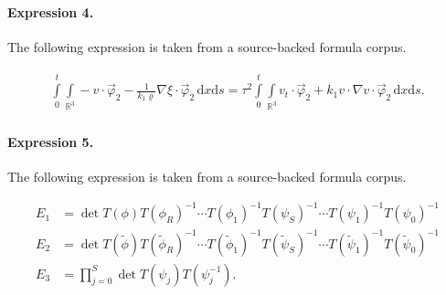 \documentclass[11pt]{article}
\begin{document}
\paragraph{Expression 4.} The following expression is taken from a source-backed formula corpus.

\begin{align*}\begin{array}{ll}\int\limits_0^t \int\limits_{\mathbb{R}^3}- v \cdot\vec{\varphi}_2 - \frac{1}{k_1\varrho}\nabla\xi\cdot\vec{\varphi}_2\,\mathrm{d}x\mathrm{d}s= \tau^2\int\limits_0^t \int\limits_{\mathbb{R}^3}v_t \cdot \vec{\varphi}_2 + k_1 v\cdot\nabla v \cdot\vec{\varphi}_2\,\mathrm{d}x\mathrm{d}s.\end{array}\end{align*}

\paragraph{Expression 5.} The following expression is taken from a source-backed formula corpus.

\begin{align*}E_1 &= \det T(\phi) T(\phi_R)^{-1}\cdots T(\phi_1)^{-1} T(\psi_S)^{-1}\cdots T(\psi_1)^{-1} T(\psi_0)^{-1}\\E_2 &= \det T(\tilde{\phi}) T(\tilde{\phi}_R)^{-1}\cdots T(\tilde{\phi}_1)^{-1}T(\tilde{\psi}_S)^{-1}\cdots T(\tilde{\psi}_1)^{-1} T(\tilde{\psi}_0)^{-1}\\E_3 &= \prod_{j=0}^S\det T(\psi_j)T(\psi_j^{-1}).\end{align*}
\end{document}
